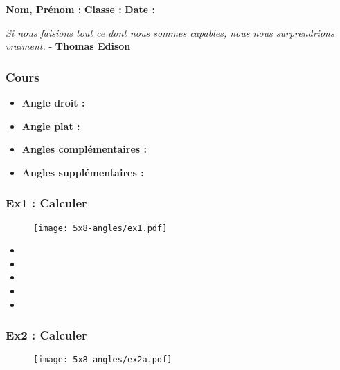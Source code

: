 



\textbf{Nom, Prénom :} \hspace{8cm} \textbf{Classe :} \hspace{3cm} \textbf{Date :}\\

\begin{center}
  \textit{Si nous faisions tout ce dont nous sommes capables, nous nous surprendrions vraiment.}  - \textbf{Thomas Edison}
\end{center}

\subsubsection*{Cours}

\begin{itemize}
  \item \textbf{Angle droit : } \dotfill
  \item \textbf{Angle plat : } \dotfill
  \item \textbf{Angles complémentaires : } \dotfill
  \item \textbf{Angles supplémentaires : } \dotfill
\end{itemize}

\subsubsection*{Ex1 : Calculer}

\begin{figure}[H]
  \centering
  \texttt{[image: 5x8-angles/ex1.pdf]}
\end{figure}

\begin{multicols}{5}
\begin{itemize}
  \item \dotfill
  \item \dotfill
  \item \dotfill
  \item \dotfill
  \item \dotfill
\end{itemize}
\end{multicols}

\subsubsection*{Ex2 : Calculer}

\begin{figure}[H]
  \centering
  \texttt{[image: 5x8-angles/ex2a.pdf]}
\end{figure}


